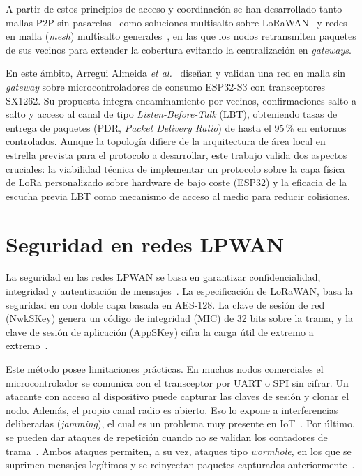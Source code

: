 A partir de estos principios de acceso y coordinación se han desarrollado tanto mallas P2P sin pasarelas~\cite{berto2021lora} como soluciones multisalto sobre LoRaWAN~\cite{cotrim2020lorawan} y redes en malla (\textit{mesh}) multisalto generales~\cite{pueyo2021beyond}, en las que los nodos retransmiten paquetes de sus vecinos para extender la cobertura evitando la centralización en \textit{gateways}.

En este ámbito, Arregui Almeida \textit{et al.}~\cite{arregui2025gatewayfree} diseñan y validan una red en malla sin \textit{gateway} sobre microcontroladores de consumo ESP32-S3 con transceptores SX1262. Su propuesta integra encaminamiento por vecinos, confirmaciones salto a salto y acceso al canal de tipo \textit{Listen-Before-Talk} (LBT), obteniendo tasas de entrega de paquetes (PDR, \textit{Packet Delivery Ratio}) de hasta el 95\,\% en entornos controlados. Aunque la topología difiere de la arquitectura de área local en estrella prevista para el protocolo a desarrollar, este trabajo valida dos aspectos cruciales: la viabilidad técnica de implementar un protocolo sobre la capa física de LoRa personalizado sobre hardware de bajo coste (ESP32) y la eficacia de la escucha previa LBT como mecanismo de acceso al medio para reducir colisiones.

\section{Seguridad en redes LPWAN}

La seguridad en las redes LPWAN se basa en garantizar confidencialidad, integridad y autenticación de mensajes~\cite{iqbal2018aes}. La especificación de LoRaWAN, basa la seguridad en con doble capa basada en AES-128. La clave de sesión de red (NwkSKey) genera un código de integridad (MIC) de 32 bits sobre la trama, y la clave de sesión de aplicación (AppSKey) cifra la carga útil de extremo a extremo~\cite{sornin2015lorawan}.

Este método posee limitaciones prácticas. En muchos nodos comerciales el microcontrolador se comunica con el transceptor por UART o SPI sin cifrar. Un atacante con acceso al dispositivo puede capturar las claves de sesión y clonar el nodo. Además, el propio canal radio es abierto. Eso lo expone a interferencias deliberadas (\textit{jamming}), el cual es un problema muy presente en IoT~\cite{sigfox2017overview}. Por último, se pueden dar ataques de repetición cuando no se validan los contadores de trama~\cite{vodafone_nbiot}. Ambos ataques permiten, a su vez, ataques tipo \textit{wormhole}, en los que se suprimen mensajes legítimos y se reinyectan paquetes capturados anteriormente~\cite{chacko2018security}.


